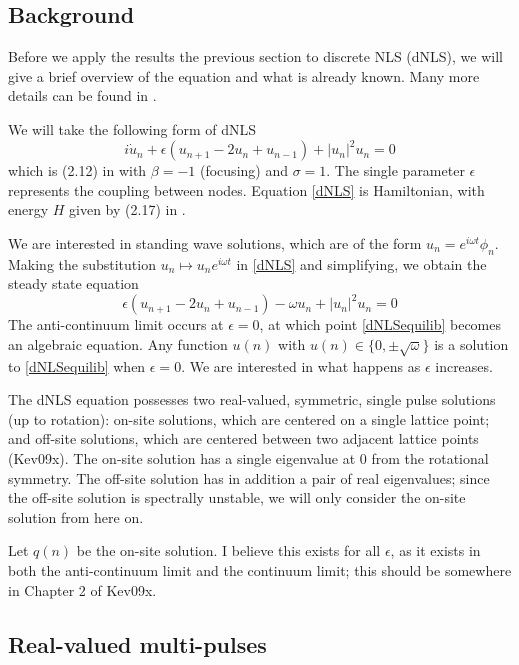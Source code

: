 \documentclass[12pt]{article}
\begin{document}
\subsection{Background}

Before we apply the results the previous section to discrete NLS (dNLS), we will give a brief overview of the equation and what is already known. Many more details can be found in \cite{Kevrekidis2009}. 

We will take the following form of dNLS
\begin{equation}\label{dNLS}
i\dot{u}_n + \epsilon(u_{n+1} - 2 u_n + u_{n-1}) + |u_n|^2 u_n = 0
\end{equation}
which is (2.12) in \cite{Kevrekidis2009} with $\beta = -1$ (focusing) and $\sigma = 1$. The single parameter $\epsilon$ represents the coupling between nodes. Equation \eqref{dNLS} is Hamiltonian, with energy $H$ given by (2.17) in \cite{Kevrekidis2009}.

We are interested in standing wave solutions, which are of the form $u_n = e^{i \omega t}\phi_n $. Making the substitution $u_n \mapsto u_n e^{i \omega t}$ in \eqref{dNLS} and simplifying, we obtain the steady state equation
\begin{equation}\label{dNLSequilib}
\epsilon(u_{n+1} - 2 u_n + u_{n-1}) - \omega u_n + |u_n|^2 u_n = 0
\end{equation}
The anti-continuum limit occurs at $\epsilon = 0$, at which point \eqref{dNLSequilib} becomes an algebraic equation. Any function $u(n)$ with $u(n) \in \{ 0, \pm \sqrt{\omega}\}$ is a solution to \eqref{dNLSequilib} when $\epsilon = 0$. We are interested in what happens as $\epsilon$ increases.

The dNLS equation possesses two real-valued, symmetric, single pulse solutions (up to rotation): on-site solutions, which are centered on a single lattice point; and off-site solutions, which are centered between two adjacent lattice points (Kev09x). The on-site solution has a single eigenvalue at 0 from the rotational symmetry. The off-site solution has in addition a pair of real eigenvalues; since the off-site solution is spectrally unstable, we will only consider the on-site solution from here on. 

Let $q(n)$ be the on-site solution. I believe this exists for all $\epsilon$, as it exists in both the anti-continuum limit and the continuum limit; this should be somewhere in Chapter 2 of Kev09x.

\subsection{Real-valued multi-pulses}
\end{document}
